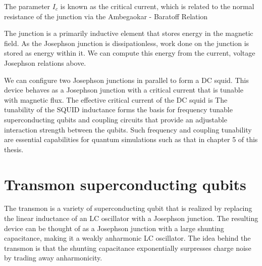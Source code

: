 
The parameter $I_c$ is known as the critical current, which is related to the normal resistance of the junction via the
Ambegaokar - Baratoff Relation \cite{Ambegaokar1963}

The junction is a primarily inductive element that stores energy in the magnetic field.  %
As the Josephson junction is dissipationless, work done on the junction is stored as energy within it.
We can compute this energy from the current, voltage Josephson relations above.

We can configure two Josephson junctions in parallel to form a DC squid.
This device behaves as a Josephson junction with a critical current that is tunable with magnetic flux.
The effective critical current of the DC squid is \cite{vanDuzer1999}
The tunability of the SQUID inductance forms the basis for frequency tunable superconducting qubits
and coupling circuits that provide an adjustable interaction strength between the qubits.
Such frequency and coupling tunability are essential capabilities for quantum simulations such as that in chapter 5 of this thesis.

\section{Transmon superconducting qubits}

The transmon is a variety of superconducting qubit that is realized by replacing the linear inductance of an LC oscillator with a Josephson junction.
The resulting device can be thought of as a Josephson junction with a large shunting capacitance, making it a weakly anharmonic LC oscillator.
The idea behind the transmon is that the shunting capacitance exponentially surpresses charge noise by trading away anharmonicity\cite{Koch2007}.

